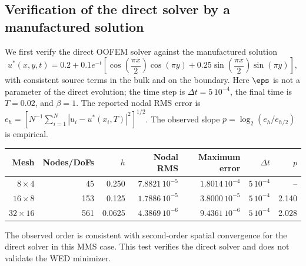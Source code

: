 \subsection{Verification of the direct solver by a manufactured solution}
We first verify the direct OOFEM solver against the manufactured solution
\begin{equation}
\label{num:mms}
u^*(x,y,t)=0.2+0.1e^{-t}\left[\cos\!\left(\frac{\pi x}{2}\right)\cos(\pi y)
+0.25\sin\!\left(\frac{\pi x}{2}\right)\sin(\pi y)\right],
\end{equation}
with consistent source terms in the bulk and on the boundary. Here $\eps$ is not a parameter of the direct evolution; the time step is $\Delta t=5\,10^{-4}$, the final time is $T=0.02$, and $\beta=1$. The reported nodal RMS error is $e_h=[N^{-1}\sum_{i=1}^N|u_i-u^*(x_i,T)|^2]^{1/2}$. The observed slope $p=\log_2(e_h/e_{h/2})$ is empirical.
\begin{center}\small
\begin{tabular}{rrrrrrr}
\hline
Mesh & Nodes/DoFs & $h$ & Nodal RMS & Maximum error & $\Delta t$ & $p$\\
\hline
$8\times4$ &45&0.250&$7.8821\,10^{-5}$&$1.8014\,10^{-4}$&$5\,10^{-4}$&--\\
$16\times8$&153&0.125&$1.7886\,10^{-5}$&$3.8000\,10^{-5}$&$5\,10^{-4}$&2.140\\
$32\times16$&561&0.0625&$4.3869\,10^{-6}$&$9.4361\,10^{-6}$&$5\,10^{-4}$&2.028\\
\hline
\end{tabular}
\end{center}
The observed order is consistent with second-order spatial convergence for the direct solver in this MMS case. This test verifies the direct solver and does not validate the WED minimizer.

